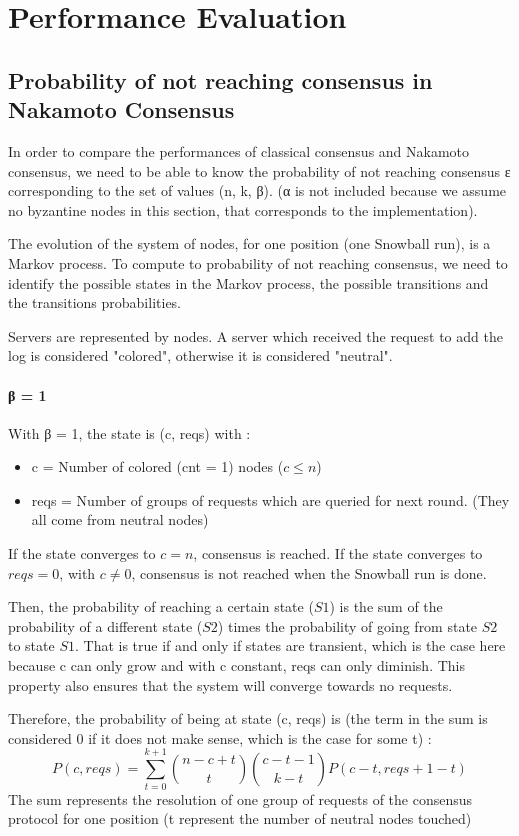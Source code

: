 \documentclass[11pt, twocolumn]{article}
\begin{document}
\section{Performance Evaluation}
\subsection{Probability of not reaching consensus in Nakamoto Consensus}

In order to compare the performances of classical consensus and Nakamoto consensus, we need to be able to know the probability of not reaching consensus ε corresponding to the set
of values (n, k, β). (α is not included because we assume no byzantine nodes in this section, that corresponds to the implementation).

The evolution of the system of nodes, for one position (one Snowball run), is a Markov process. To compute to probability of not reaching consensus, we need to identify the possible states in the
Markov process, the possible transitions and the transitions probabilities.

Servers are represented by nodes. A server which received the request to add the log is considered "colored", otherwise it is considered "neutral".

\paragraph{β = 1}
With β = 1, the state is (c, reqs) with :
\begin{itemize}
    \item c = Number of colored (cnt = 1) nodes ($c \leq n$)
    \item reqs = Number of groups of requests which are queried for next round. (They all come from neutral nodes)
\end{itemize}
If the state converges to $c = n$, consensus is reached.
If the state converges to $reqs = 0$, with $c \neq 0$, consensus is not reached when the Snowball run is done.

Then, the probability of reaching a certain state ($S1$) is the sum of the probability of a different state ($S2$) times the probability of going from state $S2$ to state $S1$.
That is true if and only if states are transient, which is the case here because c can only grow and with c constant, reqs can only diminish. This property also ensures that the system will converge towards no requests.

Therefore, the probability of being at state (c, reqs) is (the term in the sum is considered 0 if it does not make sense, which is the case for some t) :
\begin{equation*}
    P(c, reqs) = \sum_{t=0}^{k+1} {n-c+t \choose t}{c-t-1 \choose k-t}P(c-t, reqs+1-t)
\end{equation*}
The sum represents the resolution of one group of requests of the consensus protocol for one position (t represent the number of neutral nodes touched)
\end{document}
